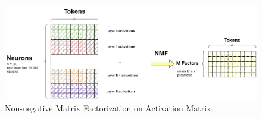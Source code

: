 \begin{figure}[h!] 
    \includegraphics[width=\textwidth]{images/nmf.drawio}
    \caption{Non-negative Matrix Factorization on Activation Matrix}
    \label{fig:nmf}
\end{figure}    
